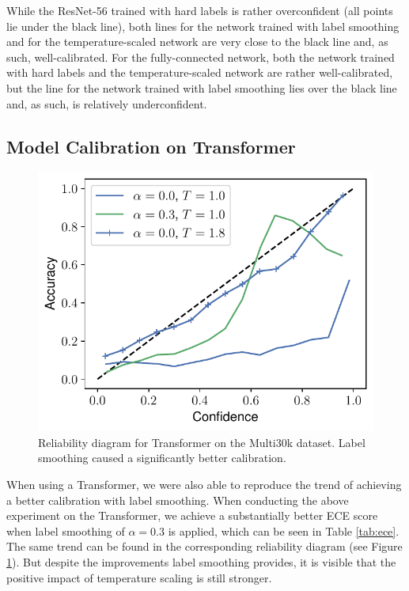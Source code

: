 While the ResNet-56 trained with hard labels is rather overconfident (all points lie under the black line), both lines for the network trained with label smoothing and for the temperature-scaled network are very close to the black line and, as such, well-calibrated. For the fully-connected network, both the network trained with hard labels and the temperature-scaled network are rather well-calibrated, but the line for the network trained with label smoothing lies over the black line and, as such, is relatively underconfident.

\subsection{Model Calibration on Transformer}
\begin{figure}\vspace{-1.1cm}
    \includegraphics[width=1\linewidth]{figures/transformer_reliability_0.3.pdf}
    \caption{Reliability diagram for Transformer on the Multi30k dataset. Label smoothing caused a significantly better calibration.}
    \vspace{-1cm}
    \label{fig:acc_conf_transformer}
\end{figure}
When using a Transformer, we were also able to reproduce the trend of achieving a better calibration with label smoothing. When conducting the above experiment on the Transformer, we achieve a substantially better ECE score when label smoothing of $\alpha = 0.3$ is applied, which can be seen in Table \ref{tab:ece}. The same trend can be found in the corresponding reliability diagram (see Figure \ref{fig:acc_conf_transformer}). But despite the improvements label smoothing provides, it is visible that the positive impact of temperature scaling is still stronger.

